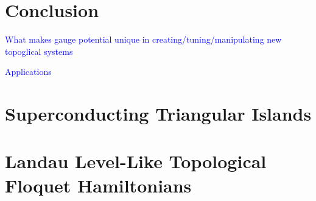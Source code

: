\documentclass[12pt,doctor]{thesis}
\newcommand{\Blue}[1]{\textcolor{blue}{#1}}
\begin{document}





\chapter{Conclusion}

  \Blue{What makes gauge potential unique in creating/tuning/manipulating new topoglical systems}

  \Blue{Applications}

  

\begin{appendices}

\chapter{Superconducting Triangular Islands}


%

\chapter{Landau Level-Like Topological Floquet Hamiltonians}








\end{appendices}



\end{document}
